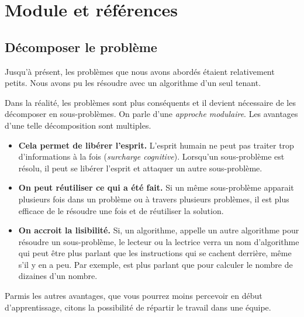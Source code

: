 \chapter{Module et références}

\minitoc

\section{Décomposer le problème}

	Jusqu’à présent, les problèmes que nous avons abordés étaient relativement
	petits.  Nous avons pu les résoudre avec un algorithme d’un seul tenant.
	
	Dans la réalité, les problèmes sont plus conséquents et il devient
	nécessaire de les décomposer en sous-problèmes.  On parle d’une
	\emph{approche modulaire}.  Les avantages d’une telle décomposition sont
	multiples.
	
	\begin{itemize}
	\item
		\textbf{Cela permet de libérer l’esprit.}
		L’esprit humain ne peut pas traiter trop d’informations à la fois
		(\emph{surcharge cognitive}).
		Lorsqu’un sous-problème est résolu,
		il peut se libérer l’esprit et attaquer un autre sous-problème.
	\item
		\textbf{On peut réutiliser ce qui a été fait.}
		Si un même sous-problème apparait plusieurs fois
		dans un problème ou à travers plusieurs problèmes,
		il est plus efficace de le résoudre une fois et
		de réutiliser la solution.
	\item
		\textbf{On accroit la lisibilité.} Si,  un algorithme, appelle un autre
		algorithme pour résoudre un sous-problème, le lecteur ou la lectrice
		verra un nom d’algorithme qui peut être plus parlant que les
		instructions qui se cachent derrière, même s’il y en a peu.  Par
		exemple,  est plus parlant que 
		pour calculer le nombre de dizaines d’un nombre.
	
\end{itemize}

	Parmis les autres avantages, que vous pourrez moins percevoir en début
	d’apprentissage, citons la possibilité de répartir le travail dans une
	équipe.
	
